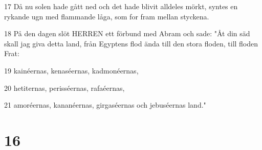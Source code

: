 \par 17 Då nu solen hade gått ned och det hade blivit alldeles mörkt, syntes en rykande ugn med flammande låga, som for fram mellan styckena.
\par 18 På den dagen slöt HERREN ett förbund med Abram och sade: "Åt din säd skall jag giva detta land, från Egyptens flod ända till den stora floden, till floden Frat:
\par 19 kainéernas, kenaséernas, kadmonéernas,
\par 20 hetiternas, perisséernas, rafaéernas,
\par 21 amoréernas, kananéernas, girgaséernas och jebuséernas land."

\chapter{16}

